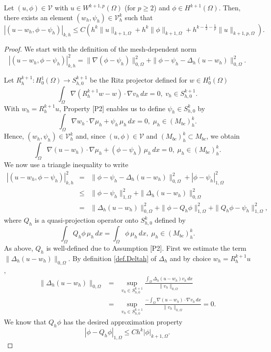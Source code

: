 \documentclass[a4paper,final]{siamltex}
\newcommand{\CV}{\mathcal{V}}
\newcommand{\M}{{M_{bc}}}
\newcommand{\Mb}{{(M_{bc})}}
\def\snorm#1#2{|#1|_{#2}}
\begin{document}
\begin{lemma}\label{lemma0}
Let $(u,\phi) \in \CV$ with 
$u \in W^{k+1,p}(\Omega)$ (for $p \geq {2}$) and
$\phi \in H^{k+1}(\Omega)$. Then, there exists an element $(w_h,\psi_h) \in \CV^k_h$
such that
\begin{equation}\label{eqn0}
\snorm{(u-w_h,\phi-\psi_h)}{k,h} \leq  C\left( h^{k} \|u\|_{k+1,\Omega} + h^k \|\phi\|_{k+1,\Omega} + 
h^{k-\frac{1}{2} - \frac{1}{p}} \|u\|_{k+1,p,\Omega}\right).
\end{equation}
\end{lemma}
\begin{proof}
We start with the definition of the mesh-dependent norm 
\[ \snorm{(u-w_h,\phi-\psi_h)}{k,h}^2 = \|\nabla (\phi - \psi_h)\|^2_{0,\Omega} + 
\|\phi-\psi_h - \Delta_h (u-w_h)\|^2_{0,\Omega}.\]

Let $R_h^{k+1}:{H^1_0}(\Omega)\rightarrow S^{k+1}_{h,0}$ be 
the Ritz projector defined for $w \in H^1_0(\Omega)$
\[\int_{\Omega}\nabla (R_h^{k+1} w-w)\cdot\nabla v_h\,dx=0,\; v_h \in S^{k+1}_{h,0}.
\] 
With $w_h = R_h^{k+1} u$, Property [P2] enables us to define  $\psi_h \in S^k_{h,0}$ by 
\begin{equation*}
\int_{\Omega}\nabla w_h\cdot\nabla \mu_h+\psi_h\,\mu_h\,dx=0,\; 
\mu_h\in \Mb^k_h.
\end{equation*}
Hence, $(w_h,\psi_h) \in \CV^k_h$ and, since $(u,\phi) \in \CV$ and $\Mb_h^k\subset \M$,
we obtain 
\begin{equation}\label{leq1}
\int_{\Omega}\nabla (u-w_h)\cdot\nabla \mu_h+(\phi-\psi_h)\,\mu_h\,dx=0,\; 
\mu_h\in \Mb^k_h.
\end{equation}
We now use a triangle inequality  to write 
\begin{eqnarray*}
 \snorm{(u-w_h,\phi-\psi_h)}{k,h}^2 &=& 
\|\phi-\psi_h-\Delta_h(u-w_h)\|^2_{0,\Omega}+ |\phi-\psi_h|^2_{1,\Omega}\\ 
&\leq & \|\phi-\psi_h\|^2_{1,\Omega}+\|\Delta_h(u-w_h)\|^2_{0,\Omega}\\
&= & 
\|\Delta_h(u-w_h)\|^2_{0,\Omega}+ \|\phi-Q_h\phi\|^2_{1,\Omega}+\|Q_h\phi-\psi_h\|^2_{1,\Omega},
\end{eqnarray*}
where $Q_h$ is a quasi-projection operator onto $S^k_{h,0}$ defined by 
\begin{equation*}
\int_{\Omega}Q_h \phi \,\mu_h\,dx =\int_{\Omega}\phi\,\mu_h\,dx,\; 
\mu_h\in \Mb^k_h.
\end{equation*}
As above, $Q_h$ is well-defined due to Assumption [P2].
First we estimate the term $\|\Delta_h(u-w_h)\|_{0,\Omega}$.
By definition \eqref{def.Deltah} of $\Delta_h$ and by choice $w_h=R_h^{k+1} u$,
\begin{eqnarray*}
\|\Delta_h(u-w_h)\|_{0,\Omega} &=& 
\sup_{v_h \in S^{k+1}_{h,0}} \frac{\int_{\Omega}  \Delta_h(u-w_h) v_h\,dx}{\|v_h\|_{0,\Omega}}\\
&=& \sup_{v_h \in S^{k+1}_{h,0}} \frac{-\int_{\Omega}  \nabla (u-w_h) \cdot \nabla v_h\,dx}{\|v_h\|_{0,\Omega}}
=0.
\end{eqnarray*}
We know  that $Q_h \phi$ \cite{Lam06,LSW05} has the desired approximation property
\[ 
 |\phi-Q_h\phi|_{1,\Omega} \leq C h^k |\phi|_{k+1,\Omega}. 
\]


\end{proof}
\end{document}

